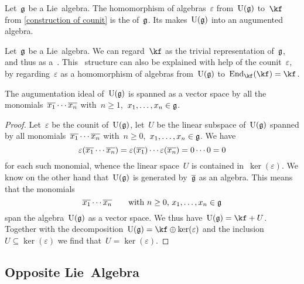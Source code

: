 \begin{definition}
  Let~$\mathfrak{g}$ be a Lie~algebra.
  The homomorphism of algebras~$\varepsilon$ from~$\Univ(\glie)$ to~$\kf$ from \cref{construction of counit} is the  of~$\mathfrak{g}$.
  Its makes~$\Univ(\glie)$ into an augumented algebra.
\end{definition}


\begin{remark}
  Let~$\mathfrak{g}$ be a Lie~algebra.
  We can regard~$\kf$ as the trivial representation of~$\mathfrak{g}$, and thus as a~\module{$\Univ(\glie)$}.
  This~\module{$\Univ(\glie)$} structure can also be explained with help of the counit~$\varepsilon$, by regarding~$\varepsilon$ as a homomorphism of algebras from~$\Univ(\glie)$ to~$\End_{\kf}(\kf) = \kf$.
\end{remark}


\begin{proposition}
  \label{augumentation ideal is spanned by monomials}
  The augumentation ideal of~$\Univ(\glie)$ is spanned as a vector space by all the monomials~$\overline{x_1} \dotsm \overline{x_n}$ with~$n \geq 1$,~$x_1, \dotsc, x_n \in \mathfrak{g}$.
\end{proposition}


\begin{proof}
  Let~$\varepsilon$ be the counit of~$\Univ(\glie)$, let~$U$ be the linear subspace of~$\Univ(\glie)$ spanned by all monomials~$\overline{x_1} \dotsm \overline{x_n}$ with~$n \geq 0$,~$x_1, \dotsc, x_n \in \mathfrak{g}$.
  We have
  \[
    \varepsilon( \overline{x_1} \dotsm \overline{x_n} )
    =
    \varepsilon( \overline{x_1} ) \dotsm \varepsilon( \overline{x_n} )
    =
    0 \dotsm 0
    =
    0
  \]
  for each such monomial, whence the linear space~$U$ is contained in~$\ker(\varepsilon)$.
  We know on the other hand that~$\Univ(\glie)$ is generated by~$\overline{\mathfrak{g}}$ as an algebra.
  This means that the monomials
  \[
    \overline{x_1}  \dotsm \overline{x_n}
    \qquad
    \text{with~$n \geq 0$,~$x_1, \dotsc, x_n \in \mathfrak{g}$}
  \]
  span the algebra~$\Univ(\glie)$ as a vector space.
  We thus have~$\Univ(\glie) = \kf + U$.
  Together with the decomposition~$\Univ(\glie) = \kf \oplus \ker(\varepsilon)$ and the inclusion~$U \subseteq \ker(\varepsilon)$ we find that~$U = \ker(\varepsilon)$.
\end{proof}



\subsection{Opposite Lie~Algebra}

